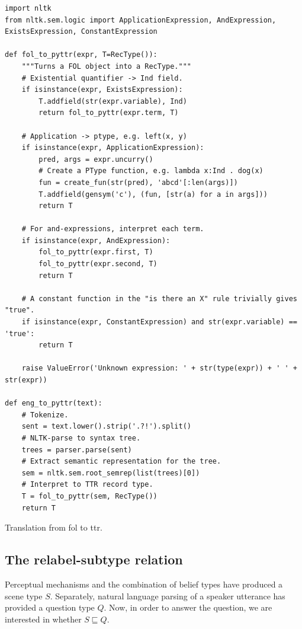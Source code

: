 \begin{listing}
\begin{lstlisting}
import nltk
from nltk.sem.logic import ApplicationExpression, AndExpression, ExistsExpression, ConstantExpression

def fol_to_pyttr(expr, T=RecType()):
    """Turns a FOL object into a RecType."""
    # Existential quantifier -> Ind field.
    if isinstance(expr, ExistsExpression):
        T.addfield(str(expr.variable), Ind)
        return fol_to_pyttr(expr.term, T)
    
    # Application -> ptype, e.g. left(x, y)
    if isinstance(expr, ApplicationExpression):
        pred, args = expr.uncurry()
        # Create a PType function, e.g. lambda x:Ind . dog(x)
        fun = create_fun(str(pred), 'abcd'[:len(args)])
        T.addfield(gensym('c'), (fun, [str(a) for a in args]))
        return T
    
    # For and-expressions, interpret each term.
    if isinstance(expr, AndExpression):
        fol_to_pyttr(expr.first, T)
        fol_to_pyttr(expr.second, T)
        return T
    
    # A constant function in the "is there an X" rule trivially gives "true".
    if isinstance(expr, ConstantExpression) and str(expr.variable) == 'true':
        return T
    
    raise ValueError('Unknown expression: ' + str(type(expr)) + ' ' + str(expr))

def eng_to_pyttr(text):
    # Tokenize.
    sent = text.lower().strip('.?!').split()
    # NLTK-parse to syntax tree.
    trees = parser.parse(sent)
    # Extract semantic representation for the tree.
    sem = nltk.sem.root_semrep(list(trees)[0])
    # Interpret to TTR record type.
    T = fol_to_pyttr(sem, RecType())
    return T
\end{lstlisting}
\caption{Translation from \gls{fol} to \gls{ttr}.}
\label{lst:foltopyttr}
\end{listing}



\subsection{The relabel-subtype relation}
\label{sec:subtyperelabeling}

Perceptual mechanisms and the combination of belief types have produced a scene type $S$.
Separately, natural language parsing of a speaker utterance has provided a question type $Q$.
Now, in order to answer the question, we are interested in whether $S \sqsubseteq Q$.

